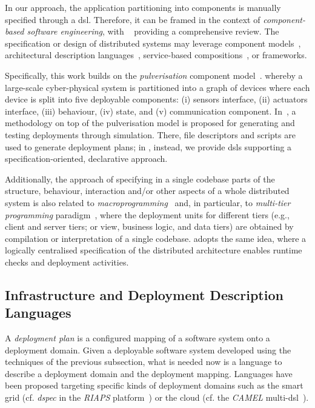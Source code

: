 \documentclass[conference]{IEEEtran}
\begin{document}
In our approach, the application partitioning into components is manually specified through a \ac{dsl}.
%
Therefore, it can be framed in the context of \emph{component-based software engineering},
 with ~\cite{vale2016component-based-se} providing a comprehensive review.
%
The specification or design of distributed systems
 may leverage
 component models~\cite{DBLP:journals/tse/CrnkovicSVC11},
 architectural description languages~\cite{DBLP:journals/tse/MedvidovicT00},
 service-based compositions~\cite{DBLP:journals/csur/LemosDB16}, 
 or frameworks.

Specifically,
 this work builds on the \emph{pulverisation} component model~\cite{FI2020-pulverization,IEEE-IoTJ-pulverization-simulation}.
 whereby a large-scale cyber-physical system
 is partitioned into a graph of devices
 where each device is split into five deployable components:
 (i) sensors interface,
 (ii) actuators interface,
 (iii) behaviour,
 (iv) state, and
 (v) communication component.
%
In~\cite{IEEE-IoTJ-pulverization-simulation},
 a methodology on top of the pulverisation model
 is proposed
 for generating and testing deployments through simulation.
%
There, file descriptors and scripts are used to generate deployment plans; in \ourframework{}, instead, we provide \acp{dsl} supporting a specification-oriented, declarative approach.
%

Additionally,
 the approach of specifying in a single codebase 
 parts of the structure, behaviour, interaction 
 and/or other aspects of a whole distributed system
 is also related to \emph{macroprogramming}~\cite{Casadei2023macro}
 and, in particular, to \emph{multi-tier programming} paradigm~\cite{DBLP:journals/csur/WeisenburgerWS20},
 where the deployment units for different tiers
(e.g., client and server tiers; or view, business logic, and data tiers)
are obtained by compilation or interpretation of a single codebase.
%
\ourframework{} adopts the same idea,
 where a logically centralised specification
 of the distributed architecture
 enables runtime checks and deployment activities.

\subsection{Infrastructure and Deployment Description Languages}
\label{sec:rw:depdesc}

A \emph{deployment plan} is a configured mapping of a software system onto a deployment domain.
%
Given a deployable software system
developed using the techniques of the previous subsection,
 what is needed now is a language to describe a deployment domain
 and the deployment mapping.
%
Languages have been proposed
 targeting specific kinds of deployment domains
 such as the smart grid (cf. \emph{dspec} in the \emph{RIAPS} platform~\cite{DBLP:conf/coins/GhoshTKKL22})
 or the cloud (cf. the \emph{CAMEL} multi-\ac{dsl}~\cite{DBLP:journals/jcloudc/AchilleosKRKDOS19}).
\end{document}
